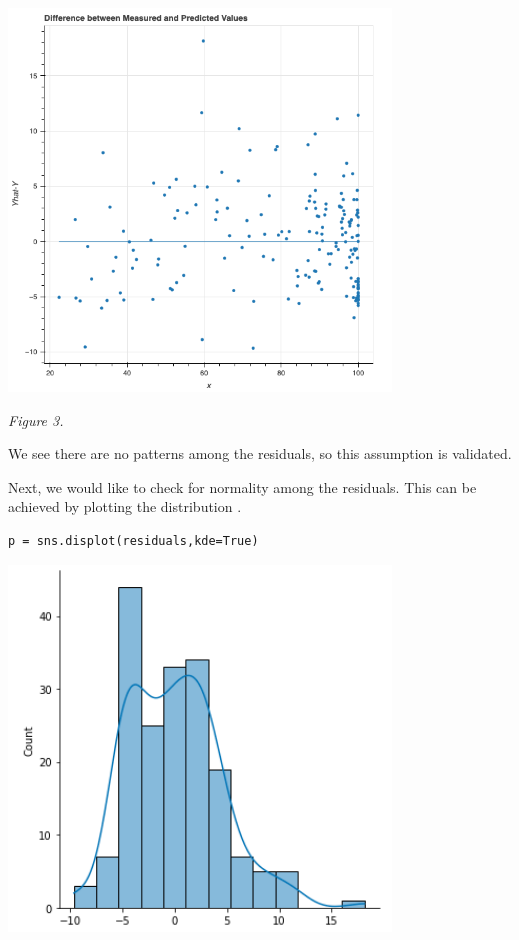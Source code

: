 \documentclass[12pt]{article}
\begin{document}
\begin{center}
\includegraphics[width=4in]{Figures/figure3.png}\\
\end{center}

\begin{center}
    \textit{Figure 3.}
\end{center}

\newpage

\noindent
We see there are no patterns among the residuals, so this assumption is validated.

\vspace{15pt}

\noindent
Next, we would like to check for normality among the residuals. This can be achieved by plotting the distribution \citep{kaggleassumptions}.

\begin{lstlisting}
p = sns.displot(residuals,kde=True)
\end{lstlisting}

\begin{center}
    \includegraphics[width=4in]{Figures/figure4.png}\\
\end{center}
\end{document}
